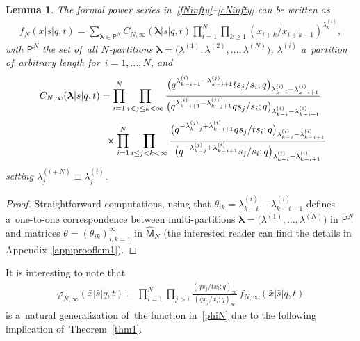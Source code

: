 \documentclass[pdftex]{sigma}%
\numberwithin{equation}{section}
\newtheorem{Lemma}[Theorem]{Lemma}
\newcommand{\vlam}{\boldsymbol{\lambda}}
\newcommand{\bx}{\bar{x}}
\newcommand{\bs}{\bar{s}}
\begin{document}
\begin{Lemma}
\label{lem1}
The formal power series in~\eqref{fNinfty}--\eqref{cNinfty} can be written as
\begin{gather}
\label{fNinfty1}
 f_N(\bx|\bs|q,t) = \sum_{\vlam\in\mathsf{P}^N} C_{N,\infty}(\vlam|\bs|q,t) \prod_{i=1}^N\prod_{k\geq 1}(x_{i+k}/x_{i+k-1})^{\lambda^{(i)}_k},
\end{gather}
with $\mathsf{P}^N$ the set of~all $N$-partitions $\vlam=\big(\lambda^{(1)},\lambda^{(2)},\dots,\lambda^{(N)}\big)$, $\lambda^{(i)}$ a~partition of~arbitrary length for~$i=1,\dots,N$, and
\begin{gather}
C_{N,\infty}(\vlam|\bs|q,t) =
\prod_{i=1}^N \prod_{i< j\leq k< \infty}
\frac{\big(q^{\lambda^{(i)}_{k-i+1} - \lambda^{(j)}_{k-j+1}}ts_{j}/s_i;q\big)_{\lambda^{(i)}_{k-i}-\lambda^{(i)}_{k-i+1}}}{\big(q^{\lambda^{(i)}_{k-i+1} - \lambda^{(j)}_{k-j+1}}qs_{j}/s_i;q\big)_{\lambda^{(i)}_{k-i}-\lambda^{(i)}_{k-i+1}}} \nonumber
\\ \hphantom{C_{N,\infty}(\vlam|\bs|q,t) = }
{} \times \prod_{i=1}^N \prod_{i\leq j<k<\infty}
\frac{\big(q^{-\lambda^{(j)}_{k-j}+\lambda^{(i)}_{k-i+1}}qs_{j}/ts_i ;q\big)_{\lambda^{(i)}_{k-i}-\lambda^{(i)}_{k-i+1}}}{\big(q^{-\lambda^{(j)}_{k-j}+\lambda^{(i)}_{k-i+1}}s_{j}/s_i ;q\big)_{\lambda^{(i)}_{k-i}-\lambda^{(i)}_{k-i+1}}}\label{CNinfty}
\end{gather}
setting $\lambda^{(i+N)}_j \equiv \lambda^{(i)}_j$.
\end{Lemma}
\begin{proof}
Straightforward computations, using that $\theta_{ik} = \lambda^{(i)}_{k-i}-\lambda^{(i)}_{k-i+1}$ defines a~one-to-one correspondence between multi-partitions $\vlam=\big(\lambda^{(1)},\dots,\lambda^{(N)}\big)$ in $\mathsf{P}^N$ and matrices $\theta=(\theta_{ik})_{i,k=1}^\infty$ in $\hat{\mathsf{M}}_N$ (the interested reader can find the details in Appendix~\ref{app:prooflem1}).
\end{proof}
It is interesting to note that
\begin{gather*}%
\varphi_{N,\infty}(\bx|\bs|q,t) \equiv \prod_{i=1}^N\prod_{j>i}\frac{(qx_j/tx_i;q)_\infty}{(qx_j/x_i;q)_\infty}\, f_{N,\infty}(\bx|\bs|q,t)
\end{gather*}
is a~natural generalization of~the function in~\eqref{phiN} due to the following implication of~Theorem~\ref{thm1}.
\end{document}
